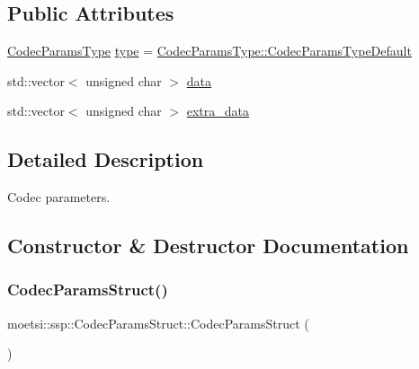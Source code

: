 \subsection*{Public Attributes}
\begin{DoxyCompactItemize}
\item 
\hyperlink{namespacemoetsi_1_1ssp_a6d638ba0bd38e9daded08f633d893563}{Codec\+Params\+Type} \hyperlink{structmoetsi_1_1ssp_1_1CodecParamsStruct_ac865cc09b5aa332a3dc00d67a91e022b}{type} = \hyperlink{namespacemoetsi_1_1ssp_a6d638ba0bd38e9daded08f633d893563a1ffd3a6c06641b95d3e5142403ed0730}{Codec\+Params\+Type\+::\+Codec\+Params\+Type\+Default}
\item 
std\+::vector$<$ unsigned char $>$ \hyperlink{structmoetsi_1_1ssp_1_1CodecParamsStruct_a8926ad622595b35a0786e8a0767d225f}{data}
\item 
std\+::vector$<$ unsigned char $>$ \hyperlink{structmoetsi_1_1ssp_1_1CodecParamsStruct_a7a3e3671d31c439210ce7902f9392de5}{extra\+\_\+data}
\end{DoxyCompactItemize}


\subsection{Detailed Description}
Codec parameters. 

\subsection{Constructor \& Destructor Documentation}
\mbox{\label{structmoetsi_1_1ssp_1_1CodecParamsStruct_ae2d0f15ae18885a73ac37cf51c78abf4}} 
\subsubsection{\texorpdfstring{Codec\+Params\+Struct()}{CodecParamsStruct()}\hspace{0.1cm}{\footnotesize\ttfamily [1/4]}}
{\footnotesize\ttfamily moetsi\+::ssp\+::\+Codec\+Params\+Struct\+::\+Codec\+Params\+Struct (\begin{DoxyParamCaption}{ }\end{DoxyParamCaption})\hspace{0.3cm}{\ttfamily [inline]}}

